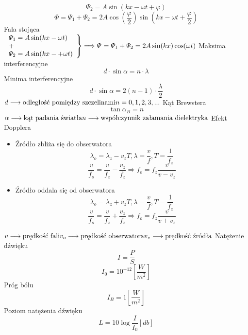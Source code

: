 \documentclass{article}
\begin{document}
\begin{enumerate}
\[		\]
		\[
		\varPsi_2 = A \sin (kx - \omega t + \varphi)
		\]
		\[
		\varPhi = \varPsi_1 + \varPsi_2 = 2A \cos \left( \frac{\varphi}{2} \right) \sin \left( kx - \omega t + \frac{\varphi}{2} \right)
		\]
		Fala stojąca \\
		$\left.
		\begin{array}{lll}
			\varPsi_1 = A \sin(kx - \omega t) \\
			+ \\
			\varPsi_2 = A \sin(kx -+\omega t)
		\end{array} 
		\right\} \Longrightarrow \varPsi = \varPsi_1 + \varPsi_2 = 2A \sin (kx) \cos (\omega t) \\ \\
		$
		Maksima interferencyjne
		\[
		d \cdot \sin \alpha = n \cdot \lambda
		\]
		Minima interferencyjne
		\[
		d \cdot \sin \alpha = 2(n - 1) \cdot \frac{\lambda}{2}
		\]
		$
		d \longrightarrow \text{odległość pomiędzy szczelinami} \\
		n = 0, 1, 2, 3, ... \\ \\
		$
		Kąt Brewstera
		\[
		\tan \alpha_B = n
		\]
		$
		\alpha \longrightarrow \text{kąt padania światła} \\
		n \longrightarrow \text{współczynnik załamania dielektryka} \\ \\
		$
		Efekt Dopplera
		\begin{itemize}
			\item Źródło zbliża się do obserwatora
			\[
			\lambda_o = \lambda_z - v_zT, \lambda = \frac{v}{f}, T = \frac{1}{f_z}
			\]
			\[
			\frac{v}{f_o} = \frac{v}{f_z} - \frac{v_z}{f_z} \Rightarrow f_o = f_z \frac{v}{v - v_z}
			\]
			\item Źródło oddala się od obserwatora
			\[
			\lambda_o = \lambda_z + v_zT, \lambda = \frac{v}{f}, T = \frac{1}{f_z}
			\]
			\[
			\frac{v}{f_o} = \frac{v}{f_z} + \frac{v_z}{f_z} \Rightarrow f_o = f_z \frac{v}{v + v_z}
			\]
		\end{itemize}
		$
		v \longrightarrow \text{prędkość fali} \\
		v_o \longrightarrow \text{prędkość obserwatora} \\
		v_z \longrightarrow \text{prędkość źródła}
		$
		\newpage
		Natężenie dźwięku
		\[
		I = \frac{P}{S}
		\]
		\[
		I_0 = 10^{-12} \left[ \frac{W}{m^2} \right]
		\]
		Próg bólu
		\[
		I_B = 1 \left[ \frac{W}{m^2} \right]
		\]
		Poziom natężenia dźwięku
		\[
		L = 10 \log \frac{I}{I_0} [db]
		\]
	
	\end{enumerate}
	
\end{document}
